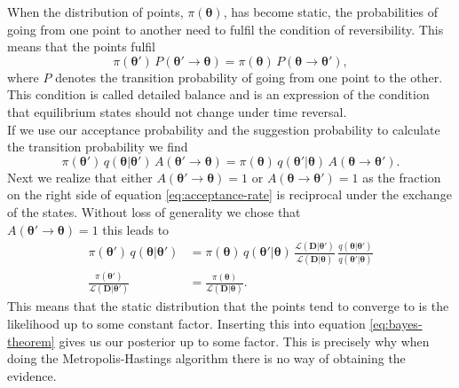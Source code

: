 \documentclass[../main.tex]{subfiles}
\begin{document}
 When the distribution of points, $\pi(\boldsymbol{\theta})$, has become static, the probabilities of going from one point to another need to fulfil the condition of reversibility. This means that the points fulfil \begin{equation}
    \pi(\boldsymbol{\theta}')\, P(\boldsymbol{\theta}'\to\boldsymbol{\theta})= \pi(\boldsymbol{\theta})\,P(\boldsymbol{\theta}\to\boldsymbol{\theta}'),
 \end{equation}
 where $P$ denotes the transition probability of going from one point to the other. This condition is called detailed balance and is an expression of the condition that equilibrium states should not change under time reversal. \\
 If we use our acceptance probability and the suggestion probability to calculate the transition probability we find \begin{equation}
    \pi(\boldsymbol{\theta}')\,q(\boldsymbol{\theta}|\boldsymbol{\theta}')\,A(\boldsymbol{\theta}'\to\boldsymbol{\theta}) = \pi(\boldsymbol{\theta})\,q(\boldsymbol{\theta}'|\boldsymbol{\theta})\,A(\boldsymbol{\theta}\to\boldsymbol{\theta}').
 \end{equation}
 Next we realize that either $A(\boldsymbol{\theta}'\to\boldsymbol{\theta})=1$ or $A(\boldsymbol{\theta}\to\boldsymbol{\theta}')=1$  as the fraction on the right side 
 of equation \ref{eq:acceptance-rate} is reciprocal under the exchange of the states. Without loss of generality we chose that \\$A(\boldsymbol{\theta}'\to\boldsymbol{\theta})=1$ this leads to 
 \begin{align}
    \pi(\boldsymbol{\theta}')\,q(\boldsymbol{\theta}|\boldsymbol{\theta}') &= \pi(\boldsymbol{\theta})\,q(\boldsymbol{\theta}'|\boldsymbol{\theta})\,\frac{\mathcal{L}(\boldsymbol{D}|\boldsymbol{\theta}')}{\mathcal{L}(\boldsymbol{D}|\boldsymbol{\theta})}\,\frac{q(\boldsymbol{\theta}|\boldsymbol{\theta}')}{q(\boldsymbol{\theta}'|\boldsymbol{\theta})} \nonumber \\
    \frac{\pi(\boldsymbol{\theta}')}{\mathcal{L}(\boldsymbol{D}|\boldsymbol{\theta}')} &= \frac{\pi(\boldsymbol{\theta})}{\mathcal{L}(\boldsymbol{D}|\boldsymbol{\theta})}.
 \end{align}
 This means that the static distribution that the points tend to converge to is the likelihood up to some constant factor. Inserting this into equation \ref{eq:bayes-theorem} gives us our posterior up to some factor. This is precisely why when doing the Metropolis-Hastings algorithm there is no way of obtaining the evidence.\\
\end{document}
